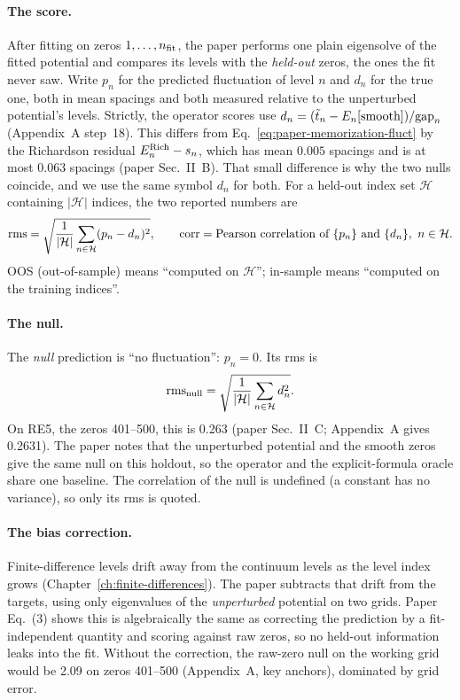 \paragraph{The score.} After fitting on zeros $1,\dots,n_{\rm fit}$, the paper performs one plain eigensolve of the fitted potential and compares its levels with the \emph{held-out} zeros, the ones the fit never saw. Write $p_n$ for the predicted fluctuation of level $n$ and $d_n$ for the true one, both in mean spacings and both measured relative to the unperturbed potential's levels. Strictly, the operator scores use $d_n=(\tilde t_n-E_n[\text{smooth}])/\mathrm{gap}_n$ (Appendix~A step~18). This differs from Eq.~\eqref{eq:paper-memorization-fluct} by the Richardson residual $E^{\rm Rich}_n-s_n$, which has mean $0.005$ spacings and is at most $0.063$ spacings (paper Sec.~II~B). That small difference is why the two nulls coincide, and we use the same symbol $d_n$ for both. For a held-out index set $\mathcal H$ containing $|\mathcal H|$ indices, the two reported numbers are
\begin{equation}
\rms=\sqrt{\frac{1}{|\mathcal H|}\sum_{n\in\mathcal H}(p_n-d_n)^2},
\qquad
\corr=\text{Pearson correlation of }\{p_n\}\text{ and }\{d_n\},\ n\in\mathcal H .
\label{eq:paper-memorization-score}
\end{equation}
OOS (out-of-sample) means ``computed on $\mathcal H$''; in-sample means ``computed on the training indices''.

\paragraph{The null.} The \emph{null} prediction is ``no fluctuation'': $p_n=0$. Its rms is
\begin{equation}
\mathrm{rms}_{\rm null}=\sqrt{\frac{1}{|\mathcal H|}\sum_{n\in\mathcal H}d_n^2}.
\label{eq:paper-memorization-null}
\end{equation}
On RE5, the zeros 401--500, this is 0.263 (paper Sec.~II~C; Appendix~A gives 0.2631). The paper notes that the unperturbed potential and the smooth zeros give the same null on this holdout, so the operator and the explicit-formula oracle share one baseline. The correlation of the null is undefined (a constant has no variance), so only its rms is quoted.

\paragraph{The bias correction.} Finite-difference levels drift away from the continuum levels as the level index grows (Chapter~\ref{ch:finite-differences}). The paper subtracts that drift from the targets, using only eigenvalues of the \emph{unperturbed} potential on two grids. Paper Eq.~(3) shows this is algebraically the same as correcting the prediction by a fit-independent quantity and scoring against raw zeros, so no held-out information leaks into the fit. Without the correction, the raw-zero null on the working grid would be 2.09 on zeros 401--500 (Appendix~A, key anchors), dominated by grid error.

